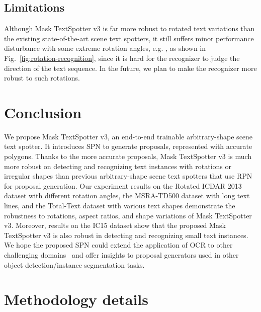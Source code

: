 \documentclass[runningheads]{llncs}
\begin{document}
\subsection{Limitations}
Although Mask TextSpotter v3 is far more robust to rotated text variations than the existing state-of-the-art scene text spotters, it still suffers minor performance disturbance with some extreme rotation angles, e.g. , as shown in Fig.~\ref{fig:rotation-recognition}, since it is hard for the recognizer to judge the direction of the text sequence. In the future, we plan to make the recognizer more robust to such rotations.

\section{Conclusion}
We propose Mask TextSpotter v3, an end-to-end trainable arbitrary-shape scene text spotter. It introduces SPN to generate proposals, represented with accurate polygons. Thanks to the more accurate proposals, Mask TextSpotter v3 is much more robust on detecting and recognizing text instances with rotations or irregular shapes than previous arbitrary-shape scene text spotters that use RPN for proposal generation. Our experiment results on the Rotated ICDAR 2013 dataset with different rotation angles, the MSRA-TD500 dataset with long text lines, and the Total-Text dataset with various text shapes demonstrate the robustness to rotations, aspect ratios, and shape variations of Mask TextSpotter v3. Moreover, results on the IC15 dataset show that the proposed Mask TextSpotter v3 is also robust in detecting and recognizing small text instances. We hope the proposed SPN could extend the application of OCR to other challenging domains~\cite{hassner2012computation} and offer insights to proposal generators used in other object detection/instance segmentation tasks.

\clearpage



\clearpage
\appendix
\section{Methodology details}
\end{document}
